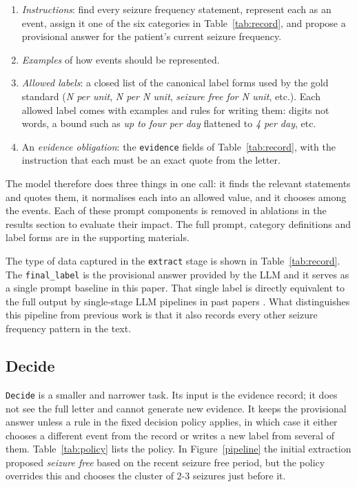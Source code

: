 \documentclass[conference]{IEEEtran}
\begin{document}
\begin{enumerate}
\item \emph{Instructions}: find every seizure frequency 
statement, represent each as an event, assign it one of the 
six categories in Table~\ref{tab:record}, and propose a 
provisional answer for the patient's current seizure 
frequency.
\item \emph{Examples} of how events should be represented.
\item \emph{Allowed labels}: a closed list of the canonical 
label forms used by the gold standard (\emph{N per unit}, 
\emph{N per N unit}, \emph{seizure free for N unit}, etc.).
Each allowed label comes with examples and rules for writing them: digits not 
words, a bound such as \emph{up to four per day} flattened to 
\emph{4 per day}, etc.
\item An \emph{evidence obligation}: the \texttt{evidence} 
fields of Table~\ref{tab:record}, with the instruction that 
each must be an exact quote from the letter.
\end{enumerate}

The model therefore does three things in one call: it finds 
the relevant statements and quotes them, it normalises each 
into an allowed value, and it chooses among the events. 
Each of these prompt components is removed in ablations 
in the results section to evaluate their impact. The full prompt, 
category definitions and label forms are in the supporting 
materials.

The type of data captured in the \texttt{extract} stage is
shown in Table~\ref{tab:record}. The \texttt{final\_label}
is the provisional answer provided by the LLM and it 
serves as a single prompt baseline in this paper. That
single label is directly equivalent to the full output 
by single-stage LLM pipelines in past papers \cite{b3}.
What distinguishes this pipeline from previous work is 
that it also records every other seizure frequency pattern 
in the text.

\subsection{Decide}
\label{sec:decide}

\texttt{Decide} is a smaller and narrower task. Its input is 
the evidence record; it does not see the full letter and cannot 
generate new evidence. It keeps the provisional answer unless a 
rule in the fixed decision policy applies, in which case it 
either chooses a different event from the record or writes a 
new label from several of them. Table~\ref{tab:policy} lists 
the policy. In Figure~\ref{pipeline} the initial extraction proposed 
\emph{seizure free} based on the recent seizure free period, but the 
policy overrides this and chooses the cluster of 2-3 seizures just 
before it. 
\end{document}
